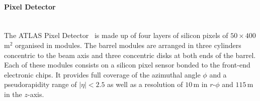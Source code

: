 \paragraph{Pixel Detector}\mbox{}\\
\label{sec:Chap2:ID:Pixel}
The ATLAS Pixel Detector~\cite{CERN-LHCC-2017-021} is made up of four layers of silicon pixels 
of $50 \times 400\,$\textmu m$^{2}$ organised in modules. The barrel modules are arranged in three cylinders
concentric to the beam axis %
and three concentric disks at both ends of the barrel. %
Each of these modules consists on a silicon pixel sensor bonded to the front-end electronic chips.
It provides full coverage of the azimuthal angle $\phi$ and a pseudorapidity range of  $|\eta| < 2.5$ as well as
a resolution of $10\,$\textmu m in $r$-$\phi$ and $115\,$\textmu m in the $z$-axis.






